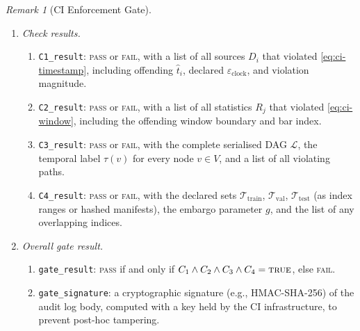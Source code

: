 \documentclass[12pt,openany]{book}
\numberwithin{equation}{chapter}
\theoremstyle{plain}
\theoremstyle{definition}
\theoremstyle{remark}
\newtheorem{remark}[theorem]{Remark}
\numberwithin{equation}{chapter}
\theoremstyle{plain}
\begin{document}
\begin{remark}[CI Enforcement Gate]
\begin{enumerate}
\begin{enumerate}
\begin{enumerate}
      \item \emph{Check results.}
      \begin{enumerate}
        \item \texttt{C1\_result}: \textsc{pass}
              or \textsc{fail}, with a list of all
              sources $D_{i}$ that violated
              \eqref{eq:ci-timestamp}, including
              offending $\hat{t}_{i}$, declared
              $\varepsilon_{\mathrm{clock}}$, and
              violation magnitude.
        \item \texttt{C2\_result}: \textsc{pass}
              or \textsc{fail}, with a list of all
              statistics $R_{j}$ that violated
              \eqref{eq:ci-window}, including the
              offending window boundary and bar
              index.
        \item \texttt{C3\_result}: \textsc{pass}
              or \textsc{fail}, with the complete
              serialised DAG $\mathcal{L}$, the
              temporal label $\tau(v)$ for every
              node $v \in V$, and a list of all
              violating paths.
        \item \texttt{C4\_result}: \textsc{pass}
              or \textsc{fail}, with the declared
              sets $\mathcal{T}_{\mathrm{train}}$,
              $\mathcal{T}_{\mathrm{val}}$,
              $\mathcal{T}_{\mathrm{test}}$ (as
              index ranges or hashed manifests),
              the embargo parameter $g$, and the
              list of any overlapping indices.
      \end{enumerate}

      \item \emph{Overall gate result.}
      \begin{enumerate}
        \item \texttt{gate\_result}: \textsc{pass}
              if and only if
              $C_{1} \wedge C_{2} \wedge C_{3}
              \wedge C_{4} = \textsc{true}$, else
              \textsc{fail}.
        \item \texttt{gate\_signature}: a
              cryptographic signature (e.g.,
              HMAC-SHA-256) of the audit log
              body, computed with a key held by
              the CI infrastructure, to prevent
              post-hoc tampering.
      \end{enumerate}

    \end{enumerate}


\end{enumerate}
\end{enumerate}
\end{remark}
\end{document}
